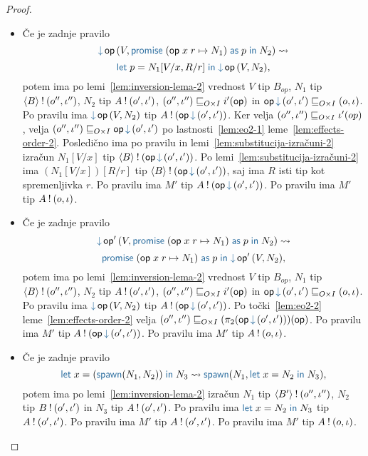 \begin{proof}
\begin{itemize}
		\item Če je zadnje pravilo $$\tmopin{op}{V}{\tmwithrec{op}{x}{r}{N_1}{p}{N_2}} \reduces $$ $$ \tmlet{p}{N_1[V/x, R/r]}{\tmopin{op}{V}{N_2}},$$ potem ima po lemi~\ref{lem:inversion-lema-2} vrednost $V$ tip $B_{op}$, $N_1$ tip $\langle B \rangle \mathbin{!} (o'', \iota'')$, $N_2$ tip $A \mathbin{!} (o', \iota')$, $(o'', \iota'') \sqsubseteq_{O \times I} i'(\mathsf{op})$ in $\opincomp{op}{(\o', \i')} \order{O \times I} (\o, \i)$.
		Po pravilu  ima $\tmopin{op}{V}{N_2}$ tip $\tycomp{A}{\opincomp{op}{(\o', \i')}}$.
		Ker velja $(o'', \iota'') \sqsubseteq_{O \times I} \iota'(op)$, velja $(\o'', \i'') \order{O \times I} \opincomp{op}{(\o', \i')}$ po lastnosti~\ref{lem:eo2-1} leme~\ref{lem:effects-order-2}.
		Posledično ima po pravilu  in lemi~\ref{lem:substitucija-izračuni-2} izračun $N_1[V/x]$ tip $\tycomp{\typromise{B}}{\opincomp{op}{(\o', \i')}}$.
		Po lemi~\ref{lem:substitucija-izračuni-2} ima $(N_1[V/x])[R/r]$ tip $\tycomp{\typromise{B}}{\opincomp{op}{(\o', \i')}}$, saj ima $R$ isti tip kot spremenljivka $r$.
		Po pravilu  ima $M'$ tip $\tycomp{A}{\opincomp{op}{(\o', \i')}}$.
		Po pravilu  ima $M'$ tip $A \mathbin{!} (o, \iota)$.
		
		\item Če je zadnje pravilo $$\tmopin{op'}{V}{\tmwithrec{op}{x}{r}{N_1}{p}{N_2}} \reduces $$ $$ \tmwithrec{op}{x}{r}{N_1}{p}{\tmopin{op'}{V}{N_2}},$$ potem ima po lemi~\ref{lem:inversion-lema-2} vrednost $V$ tip $B_{op}$, $N_1$ tip $\langle B \rangle \mathbin{!} (o'', \iota'')$, $N_2$ tip $A \mathbin{!} (o', \iota')$, $(o'', \iota'') \sqsubseteq_{O \times I} i'(\mathsf{op})$ in $\opincomp{op}{(\o', \i')} \order{O \times I} (\o, \i)$.
		Po pravilu  ima $\tmopin{op}{V}{N_2}$ tip $\tycomp{A}{\opincomp{op}{(\o', \i')}}$.
		Po točki~\ref{lem:eo2-2} leme~\ref{lem:effects-order-2} velja $(\o'', \i'') \order{O \times I} (\pi_2(\opincomp{\op}{(\o', \i')}))(\op)$.
		Po pravilu  ima $M'$ tip $\tycomp{A}{\opincomp{op}{(\o', \i')}}$.
		Po pravilu  ima $M'$ tip $A \mathbin{!} (o, \iota)$.

		\item Če je zadnje pravilo $$\tmlet{x}{(\tmspawn{N_1}{N_2})}{N_3} \reduces \tmspawn{N_1}{\tmlet{x}{N_2}{N_3}},$$ potem ima po lemi~\ref{lem:inversion-lema-2} izračun $N_1$ tip $\langle B' \rangle \mathbin{!} (o'', \iota'')$, $N_2$ tip $B \mathbin{!} (o', \iota')$ in $N_3$ tip $A \mathbin{!} (o', \iota')$.
		Po pravilu  ima $\tmlet{x}{N_2}{N_3}$ tip $A \mathbin{!} (o', \iota')$.
		Po pravilu  ima $M'$ tip $A \mathbin{!} (o', \iota')$.
		Po pravilu  ima $M'$ tip $A \mathbin{!} (o, \iota)$.


\end{itemize}
\end{proof}
